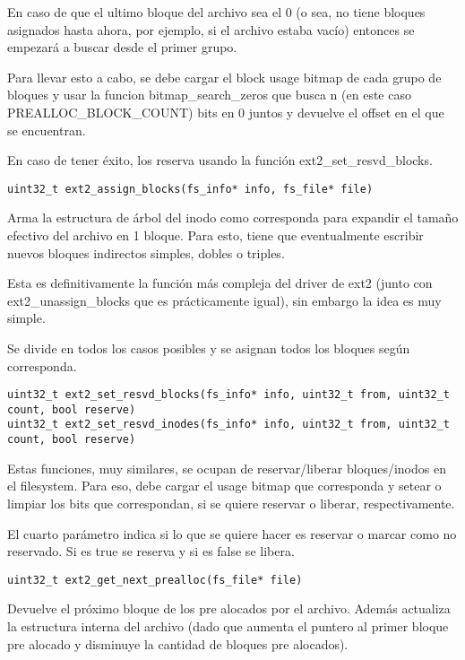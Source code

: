 En caso de que el ultimo bloque del archivo sea el 0 (o sea, no tiene bloques asignados hasta ahora, por ejemplo, si el archivo estaba vacío) entonces se empezará a buscar desde el primer grupo.

Para llevar esto a cabo, se debe cargar el block usage bitmap de cada grupo de bloques y usar la funcion bitmap\_search\_zeros que busca n (en este caso PREALLOC\_BLOCK\_COUNT) bits en 0 juntos y devuelve el offset en el que se encuentran.

En caso de tener éxito, los reserva usando la función ext2\_set\_resvd\_blocks.


\begin{lstlisting}[style=customc]
uint32_t ext2_assign_blocks(fs_info* info, fs_file* file)
\end{lstlisting}

Arma la estructura de árbol del inodo como corresponda para expandir el tamaño efectivo del archivo en 1 bloque. Para esto, tiene que eventualmente escribir nuevos bloques indirectos simples, dobles o triples.

Esta es definitivamente la función más compleja del driver de ext2 (junto con ext2\_unassign\_blocks que es prácticamente igual), sin embargo la idea es muy simple.

Se divide en todos los casos posibles y se asignan todos los bloques según corresponda.

\begin{lstlisting}[style=customc]
uint32_t ext2_set_resvd_blocks(fs_info* info, uint32_t from, uint32_t count, bool reserve)
uint32_t ext2_set_resvd_inodes(fs_info* info, uint32_t from, uint32_t count, bool reserve)
\end{lstlisting}

Estas funciones, muy similares, se ocupan de reservar/liberar bloques/inodos en el filesystem. Para eso, debe cargar el usage bitmap que corresponda y setear o limpiar los bits que correspondan, si se quiere reservar o liberar, respectivamente. 

El cuarto parámetro indica si lo que se quiere hacer es reservar o marcar como no reservado. Si es true se reserva y si es false se libera.

\begin{lstlisting}[style=customc] 
uint32_t ext2_get_next_prealloc(fs_file* file)
\end{lstlisting}

Devuelve el próximo bloque de los pre alocados por el archivo. Además actualiza la estructura interna del archivo (dado que aumenta el puntero al primer bloque pre alocado y disminuye la cantidad de bloques pre alocados).


